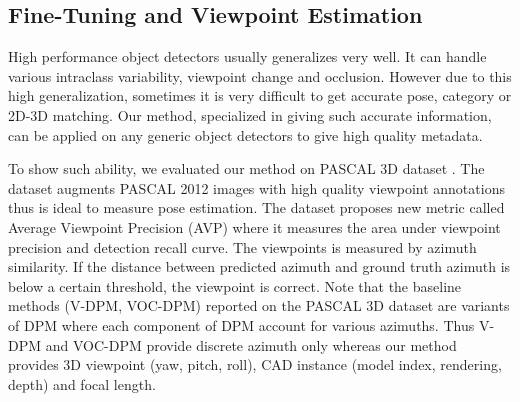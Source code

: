 \documentclass[10pt,twocolumn,letterpaper]{article}
\begin{document}
% 

\subsection{Fine-Tuning and Viewpoint Estimation}

High performance object detectors usually generalizes very well. It can handle various intraclass variability, viewpoint change and occlusion. However due to this high generalization, sometimes it is very difficult to get accurate pose, category or 2D-3D matching. Our method, specialized in giving such accurate information, can be applied on any generic object detectors to give high quality metadata.

To show such ability, we evaluated our method on PASCAL 3D dataset \cite{Xiang14}. The dataset augments PASCAL 2012 images with high quality viewpoint annotations thus is ideal to measure pose estimation. The dataset proposes new metric called Average Viewpoint Precision (AVP) where it measures the area under viewpoint precision and detection recall curve. The viewpoints is measured by azimuth similarity. If the distance between predicted azimuth and ground truth azimuth is below a certain threshold, the viewpoint is correct. Note that the baseline methods (V-DPM, VOC-DPM) reported on the PASCAL 3D dataset are variants of DPM where each component of DPM account for various azimuths. Thus V-DPM and VOC-DPM provide discrete azimuth only whereas our method provides 3D viewpoint (yaw, pitch, roll), CAD instance (model index, rendering, depth) and focal length.
\end{document}
